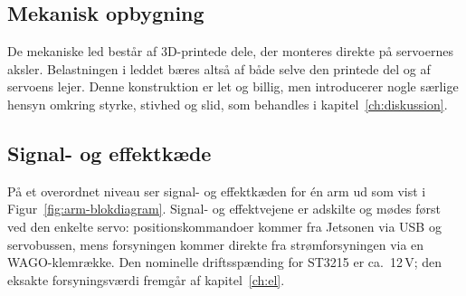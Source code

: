 \clearpage
\subsection{Mekanisk opbygning}

De mekaniske led består af 3D-printede dele, der monteres direkte
på servoernes aksler. Belastningen i leddet bæres altså af både
selve den printede del og af servoens lejer. Denne konstruktion er let og
billig, men introducerer nogle særlige hensyn omkring styrke, stivhed og
slid, som behandles i kapitel~\ref{ch:diskussion}.

\subsection{Signal- og effektkæde}

På et overordnet niveau ser signal- og effektkæden for én arm ud som
vist i Figur~\ref{fig:arm-blokdiagram}. Signal- og effektvejene er
adskilte og mødes først ved den enkelte servo: positionskommandoer kommer
fra Jetsonen via USB og servobussen, mens forsyningen kommer direkte fra
strømforsyningen via en WAGO-klemrække. Den nominelle driftsspænding
for ST3215 er ca.\ 12\,V; den eksakte forsynings\-værdi fremgår af
kapitel~\ref{ch:el}.

